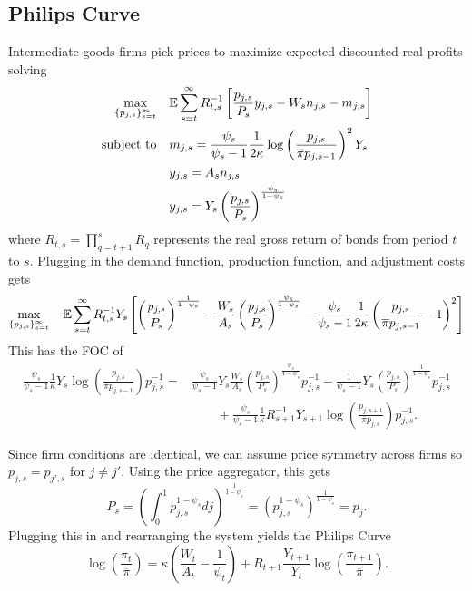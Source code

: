 \subsection{Philips Curve}

Intermediate goods firms pick prices to maximize expected discounted real profits solving
\begin{alignat*}{4}
    \max_{\{p_{j, s}\}_{s = t}^\infty} \quad & \mathbb{E} \sum_{s = t}^\infty R_{t, s}^{-1} \left[ \frac{p_{j, s}}{P_s} y_{j, s} - W_s n_{j, s} - m_{j, s} \right] \\
    \text{subject to} \quad & m_{j, s} = \frac{\psi_s}{\psi_s - 1} \frac{1}{2 \kappa} \log \left(\frac{p_{j, s}}{\overline{\pi} p_{j, s-1}}\right)^2 Y_s \\
    & y_{j, s} = A_s n_{j, s} \\
    & y_{j, s} = Y_s \left(\frac{p_{j, s}}{P_s}\right)^\frac{\psi_s}{1 - \psi_s}
\end{alignat*}
where $R_{t, s} = \prod_{q = t + 1}^s R_q$ represents the real gross return of bonds from period $t$ to $s$. Plugging in the demand function, production function, and adjustment costs gets
\begin{equation*}
    \max_{\{p_{j, s}\}_{s = t}^\infty} \quad \mathbb{E} \sum_{s = t}^\infty R_{t, s}^{-1} Y_s \left[ \left(\frac{p_{j, s}}{P_s}\right)^\frac{1}{1 - \psi_s} - \frac{W_s}{A_s} \left(\frac{p_{j, s}}{P_s}\right)^\frac{\psi_s}{1 - \psi_s} - \frac{\psi_s}{\psi_s - 1} \frac{1}{2 \kappa} \left(\frac{p_{j, s}}{{\overline{\pi} p_{j, s - 1}}} - 1\right)^2 \right]
\end{equation*}
This has the FOC of
\begin{align*}
    \frac{\psi_s}{\psi_s - 1} \frac{1}{\kappa} Y_s \log \left(\frac{p_{j, s}}{\overline{\pi} p_{j, s-1}}\right) p_{j, s}^{-1} =& \frac{\psi_s}{\psi_s - 1} Y_s \frac{W_s}{A_s} \left(\frac{p_{j, s}}{P_s}\right)^\frac{\psi_s}{1 - \psi_s} p_{j, s}^{-1} - \frac{1}{\psi_s - 1} Y_s \left(\frac{p_{j, s}}{P_s}\right)^\frac{1}{1 - \psi_s} p_{j, s}^{-1} \\
    &\qquad + \frac{\psi_s}{\psi_s - 1} \frac{1}{\kappa} R_{s+1}^{-1} Y_{s+1} \log \left(\frac{p_{j, s+1}}{\overline{\pi} p_{j,s}}\right) p_{j, s}^{-1}.
\end{align*}

Since firm conditions are identical, we can assume price symmetry across firms so $p_{j, s} = p_{j', s}$ for $j \neq j'$. Using the price aggregator, this gets
\begin{equation*}
    P_s = \left(\int_0^1 p_{j, s}^{1 - \psi_s} dj \right)^\frac{1}{1 - \psi_s} = \left(p_{j, s}^{1 - \psi_s} \right)^\frac{1}{1 - \psi_s} = p_j.
\end{equation*}
Plugging this in and rearranging the system yields the Philips Curve
\begin{equation*}
    \log \left(\frac{\pi_t}{\overline{\pi}}\right) = \kappa \left(\frac{W_t}{A_t} - \frac{1}{\psi_t}\right) + R_{t+1} \frac{Y_{t+1}}{Y_t} \log\left(\frac{\pi_{t+1}}{\overline{\pi}}\right).
\end{equation*}


